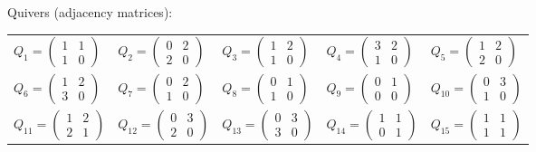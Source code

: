 \documentclass{article}
\begin{document}
\noindent Quivers (adjacency matrices):\\[3pt]
\renewcommand{\arraystretch}{1.4}
\begin{tabular}{lllll}
$Q_{1}=\left(\begin{smallmatrix}1&1\\1&0\end{smallmatrix}\right)$ & $Q_{2}=\left(\begin{smallmatrix}0&2\\2&0\end{smallmatrix}\right)$ & $Q_{3}=\left(\begin{smallmatrix}1&2\\1&0\end{smallmatrix}\right)$ & $Q_{4}=\left(\begin{smallmatrix}3&2\\1&0\end{smallmatrix}\right)$ & $Q_{5}=\left(\begin{smallmatrix}1&2\\2&0\end{smallmatrix}\right)$ \\[5pt]
$Q_{6}=\left(\begin{smallmatrix}1&2\\3&0\end{smallmatrix}\right)$ & $Q_{7}=\left(\begin{smallmatrix}0&2\\1&0\end{smallmatrix}\right)$ & $Q_{8}=\left(\begin{smallmatrix}0&1\\1&0\end{smallmatrix}\right)$ & $Q_{9}=\left(\begin{smallmatrix}0&1\\0&0\end{smallmatrix}\right)$ & $Q_{10}=\left(\begin{smallmatrix}0&3\\1&0\end{smallmatrix}\right)$ \\[5pt]
$Q_{11}=\left(\begin{smallmatrix}1&2\\2&1\end{smallmatrix}\right)$ & $Q_{12}=\left(\begin{smallmatrix}0&3\\2&0\end{smallmatrix}\right)$ & $Q_{13}=\left(\begin{smallmatrix}0&3\\3&0\end{smallmatrix}\right)$ & $Q_{14}=\left(\begin{smallmatrix}1&1\\0&1\end{smallmatrix}\right)$ & $Q_{15}=\left(\begin{smallmatrix}1&1\\1&1\end{smallmatrix}\right)$ \\[5pt]

\end{tabular}
\end{document}
